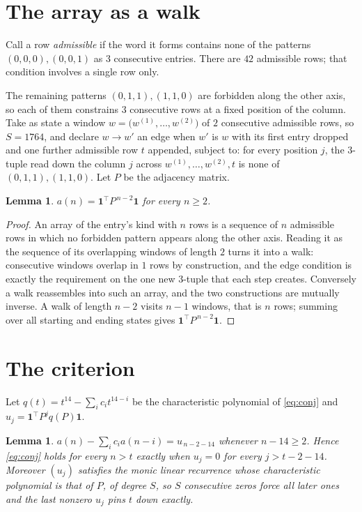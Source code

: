 \documentclass[11pt,a4paper]{article}
\theoremstyle{plain}
\newtheorem{lemma}[theorem]{Lemma}
\theoremstyle{definition}
\begin{document}
\section{The array as a walk}

Call a row \emph{admissible} if the word it forms contains none of the patterns
$(0,0,0), (0,0,1)$ as $3$ consecutive entries. There are $42$ admissible rows; that condition
involves a single row only.

The remaining patterns $(0,1,1), (1,1,0)$ are forbidden along the other axis, so each of them
constrains $3$ consecutive rows at a fixed position of the column. Take as state a
window $w=\bigl(w^{(1)},\dots,w^{(2)}\bigr)$ of $2$ consecutive admissible
rows, so $S=1764$, and declare $w\to w'$ an edge when $w'$ is $w$ with its first entry
dropped and one further admissible row $t$ appended, subject to: for every position
$j$, the $3$-tuple read down the column $j$ across $w^{(1)},\dots,w^{(2)},t$
is none of $(0,1,1), (1,1,0)$. Let $P$ be the adjacency matrix.

\begin{lemma}\label{lem:walk}
$a(n)=\mathbf{1}^{\!\top}P^{\,n-2}\mathbf{1}$ for every $n\ge2$.
\end{lemma}

\begin{proof}
An array of the entry's kind with $n$ rows is a sequence of $n$ admissible rows in
which no forbidden pattern appears along the other axis. Reading it as the sequence of its
overlapping windows of length $2$ turns it into a walk: consecutive windows overlap in
$1$ rows by construction, and the edge condition is exactly the requirement on the one
new $3$-tuple that each step creates. Conversely a walk reassembles into such an array,
and the two constructions are mutually inverse. A walk of length $n-2$ visits $n-1$
windows, that is $n$ rows; summing over all starting and ending states gives
$\mathbf{1}^{\!\top}P^{\,n-2}\mathbf{1}$.
\end{proof}

\section{The criterion}

Let $q(t)=t^{14}-\sum_i c_i t^{14-i}$ be the characteristic polynomial of
\eqref{eq:conj} and $u_j=\mathbf{1}^{\!\top}P^{j}q(P)\mathbf{1}$.

\begin{lemma}\label{lem:crit}
$a(n)-\sum_i c_i a(n-i)=u_{\,n-2-14}$ whenever $n-14\ge2$. Hence
\eqref{eq:conj} holds for every $n>t$ exactly when $u_j=0$ for every
$j>t-2-14$. Moreover $(u_j)$ satisfies the monic linear recurrence whose
characteristic polynomial is that of $P$, of degree $S$, so $S$ consecutive zeros force all
later ones and the last nonzero $u_j$ pins $t$ down exactly.
\end{lemma}
\end{document}
